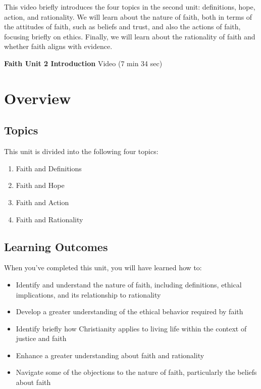 \documentclass[
]{book}
\providecommand{\tightlist}{%
  \setlength{\itemsep}{0pt}\setlength{\parskip}{0pt}}
\begin{document}
This video briefly introduces the four topics in the second unit: definitions, hope, action, and rationality. We will learn about the nature of faith, both in terms of the attitudes of faith, such as beliefs and trust, and also the actions of faith, focusing briefly on ethics. Finally, we will learn about the rationality of faith and whether faith aligns with evidence.

\textbf{Faith Unit 2 Introduction} Video (7 min 34 sec)

\hypertarget{overview-1}{%
\section*{Overview}\label{overview-1}}

\hypertarget{topics-1}{%
\subsection*{Topics}\label{topics-1}}

This unit is divided into the following four topics:

\begin{enumerate}
\def\labelenumi{\arabic{enumi}.}
\tightlist
\item
  Faith and Definitions
\item
  Faith and Hope
\item
  Faith and Action
\item
  Faith and Rationality
\end{enumerate}

\hypertarget{learning-outcomes-1}{%
\subsection*{Learning Outcomes}\label{learning-outcomes-1}}

When you've completed this unit, you will have learned how to:

\begin{itemize}
\tightlist
\item
  Identify and understand the nature of faith, including definitions, ethical implications, and its relationship to rationality
\item
  Develop a greater understanding of the ethical behavior required by faith
\item
  Identify briefly how Christianity applies to living life within the context of justice and faith
\item
  Enhance a greater understanding about faith and rationality
\item
  Navigate some of the objections to the nature of faith, particularly the beliefs about faith
\end{itemize}
\end{document}
